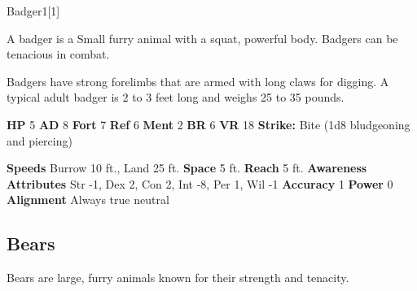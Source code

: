   
  \begin{monsection}{Badger}{1}[1]
    \vspace{-1em}\vspace{-1em}
    \vspace{0em}

    
        A badger is a Small furry animal with a squat, powerful body.
        Badgers can be tenacious in combat.
      
        Badgers have strong forelimbs that are armed with long claws for digging.
        A typical adult badger is 2 to 3 feet long and weighs 25 to 35 pounds.
      

    \begin{spellcontent}
      \begin{spelltargetinginfo}
        \pari \textbf{HP} 5 \monsep
          \textbf{AD} 8 \monsep
          \textbf{Fort} 7 \monsep
          \textbf{Ref} 6 \monsep
          \textbf{Ment} 2
        \pari \textbf{BR} 6 \monsep
        \textbf{VR} 18
        \pari \textbf{Strike:}
            Bite  (1d8 bludgeoning and piercing)
      \end{spelltargetinginfo}
    \end{spellcontent}
    \begin{monsterfooter}
      \pari \textbf{Speeds} Burrow 10 ft., Land 25 ft. \monsep
        \textbf{Space} 5 ft. \monsep
        \textbf{Reach} 5 ft.
      \pari \textbf{Awareness} 
      \pari \textbf{Attributes}
        Str -1, Dex 2,
        Con 2, Int -8,
        Per 1, Wil -1
      \pari \textbf{Accuracy} 1 \monsep
        \textbf{Power} 0
      \pari \textbf{Alignment} Always true neutral
    \end{monsterfooter}
  \end{monsection}
  
  
    \subsection{Bears}
      
        Bears are large, furry animals known for their strength and tenacity.
      

